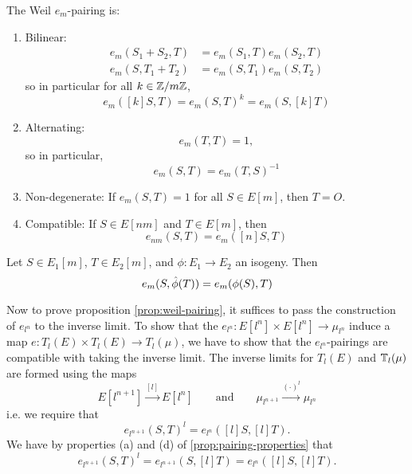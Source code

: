 \begin{proposition}
	\label{prop:pairing-properties}
	The Weil $e_m$-pairing is:
	\begin{enumerate}[itemsep=0em, label=(\alph*)]
		\item Bilinear:
			\begin{align*}
				e_m(S_1 + S_2, T) &= e_m(S_1, T)e_m(S_2, T)\\
				e_m(S, T_1 + T_2) &= e_m(S, T_1)e_m(S, T_2)
			\end{align*}
			so in particular for all $k \in \mathbb{Z}/m\mathbb{Z}$,
			\begin{equation*}
				e_m([k]S, T) = e_m(S, T)^k = e_m(S, [k]T)
			\end{equation*}
		\item Alternating:
			\begin{equation*}
				e_m(T, T) = 1,
			\end{equation*}
			so in particular,
			\begin{equation*}
				e_m(S, T) = e_m(T, S)^{-1}
			\end{equation*}
		\item Non-degenerate:
			If $e_m(S, T) = 1$ for all $S \in E[m]$, then $T = O$.
		\item Compatible:
			If $S \in E[nm]$ and $T \in E[m]$, then
			\begin{equation*}
				e_{nm}(S, T) = e_m([n]S, T)
			\end{equation*}
	\end{enumerate}
\end{proposition}

\begin{proposition}
	Let $S \in E_1[m]$, $T \in E_2[m]$, and $\phi: E_1 \to E_2$
	an isogeny. Then
	\begin{equation*}
		e_m(S, \Hat\phi(T)) = e_m(\phi(S), T)
	\end{equation*}
\end{proposition}

Now to prove proposition \ref{prop:weil-pairing}, it suffices to pass the 
construction of $e_{l^n}$ to the inverse limit.
To show that the $e_{l^n}: E[l^n]\times E[l^n] \to \mu_{l^n}$ induce a map 
$e: T_l(E) \times T_l(E) \to T_l(\mu)$, we have to show that the
$e_{l^n}$-pairings are compatible with taking the inverse limit.
The inverse limits for $T_l(E)$ and $\mathbb{T}_l(\mu)$ are formed using the maps
\begin{equation*}
	E[l^{n+1}]\xrightarrow{[l]}E[l^n]
	\qquad\textrm{and}\qquad
	\mu_{l^{n+1}}\xrightarrow{(\cdot)^l}\mu_{l^n}
\end{equation*}
i.e.
we require that
\begin{equation*}
	e_{l^{n+1}}(S, T)^l = e_{l^n}([l]S, [l]T).	
\end{equation*}
We have by properties (a) and (d) of \ref{prop:pairing-properties} that
\begin{equation*}
	e_{l^{n+1}}(S, T)^l = e_{l^{n+1}}(S, [l]T) = e_{l^n}([l]S, [l]T).
\end{equation*}

